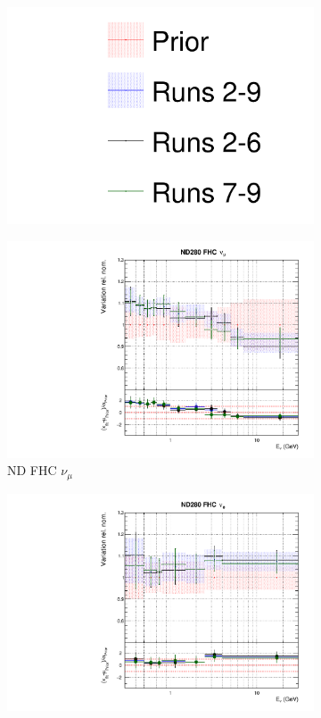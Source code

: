 \begin{figure}
\centering
\begin{subfigure}{0.95\textwidth}
  \centering
  \includegraphics[width=0.24\linewidth]{figs/newolddatafits_leg}
\end{subfigure}
\begin{subfigure}{0.24\textwidth}
  \centering
  \includegraphics[width=0.95\linewidth]{figs/newolddatafitsflux_0}
  \caption{ND FHC $\nu_{\mu}$}
\end{subfigure}
\begin{subfigure}{0.24\textwidth}
  \centering
  \includegraphics[width=0.95\linewidth]{figs/newolddatafitsflux_1}

\end{subfigure}
\end{figure}
